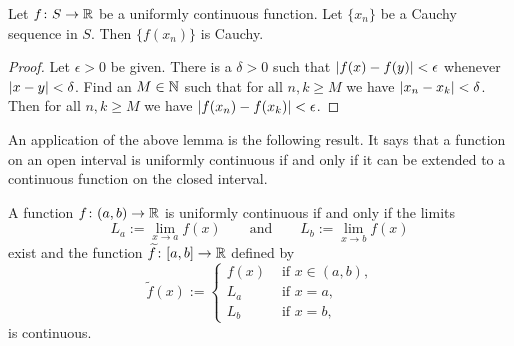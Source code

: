 \begin{lemma} \label{unifcauchycauchy:lemma}
Let $f \colon S \to {\mathbb{R}}$ be a uniformly continuous function.  Let
$\{ x_n \}$ be a Cauchy sequence in $S$.  Then $\{ f(x_n) \}$ is Cauchy.
\end{lemma}

\begin{proof}
Let $\epsilon > 0$ be given.  There is a $\delta > 0$ such that
$\left\lvert {f(x)-f(y)} \right\rvert < \epsilon$ whenever $\left\lvert {x-y} \right\rvert < \delta$.  Find an $M
\in {\mathbb{N}}$ such that for all $n, k \geq M$ we have $\left\lvert {x_n-x_k} \right\rvert < \delta$.
Then for all $n, k \geq M$ we have $\left\lvert {f(x_n)-f(x_k)} \right\rvert < \epsilon$.
\end{proof}

An application of the above lemma is the following result.  It says that
a function on an open interval is uniformly continuous if and only if
it can be extended to a continuous function on the closed interval.

\begin{prop} \label{context:prop}
A function $f \colon (a,b) \to {\mathbb{R}}$ is uniformly continuous if and only if
the limits 
\begin{equation*}
L_a := \lim_{x \to a} f(x) \qquad \text{and} \qquad
L_b := \lim_{x \to b} f(x)
\end{equation*}
exist and the function $\widetilde{f} \colon [a,b] \to {\mathbb{R}}$
defined by
\begin{equation*}
\widetilde{f}(x) :=
\begin{cases}
f(x) & \text{ if $x \in (a,b)$,} \\
L_a & \text{ if $x = a$,} \\
L_b & \text{ if $x = b$,}
\end{cases}
\end{equation*}
is continuous.
\end{prop}

